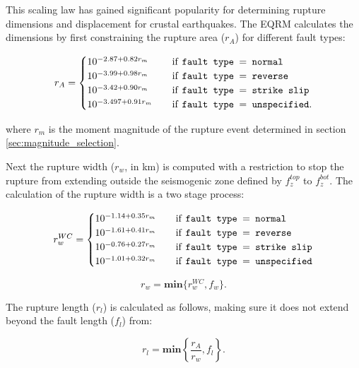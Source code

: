 This scaling law has gained significant popularity for determining rupture dimensions and displacement for crustal earthquakes. The EQRM calculates the dimensions by first 
constraining the rupture area ($r_A$) for different fault types:

\begin{equation} \label{ra}
r_A = 
\begin{cases}
10^{-2.87 + 0.82r_m}	& \quad \mbox{if \texttt{fault type $=$  normal}} \\
10^{-3.99 + 0.98r_m}	& \quad \mbox{if \texttt{fault type $=$  reverse}} \\
10^{-3.42 + 0.90r_m}	& \quad \mbox{if \texttt{fault type $=$  strike slip}} \\
10^{-3.497 + 0.91r_m}	& \quad \mbox{if \texttt{fault type $=$  unspecified}} . \\
\end{cases}
\end{equation}

where $r_m$ is the moment magnitude of the rupture event determined in section \ref{sec:magnitude_selection}. 

Next the rupture width ($r_w$, in km) is computed with a restriction to stop the rupture from extending 
outside the seismogenic zone defined by $f_z^{top}$ to $f_z^{bot}$. The calculation of the rupture width is a two stage process:


\begin{equation}\label{rw}
r_w^{WC} = 
\begin{cases}
10^{-1.14 + 0.35r_m}	& \quad \mbox{if \texttt{fault type $=$  normal}} \\
10^{-1.61 + 0.41r_m}	& \quad \mbox{if \texttt{fault type $=$  reverse}} \\
10^{-0.76 + 0.27r_m}	& \quad \mbox{if \texttt{fault type $=$  strike slip}} \\
10^{-1.01 + 0.32r_m}	& \quad \mbox{if \texttt{fault type $=$  unspecified}} \\
\end{cases}
\end{equation}


\begin{equation} \label{eq:rw}
r_w = \mathbf{min}\{r_w^{WC}, f_w\} .
\end{equation}

The rupture length ($r_l$) is calculated as follows, making sure it does not extend beyond the fault length ($f_l$) from:

\begin{equation}
r_l = \mathbf{min}\left\{\frac{r_A}{r_w}, f_l\right\} .
\end{equation}


